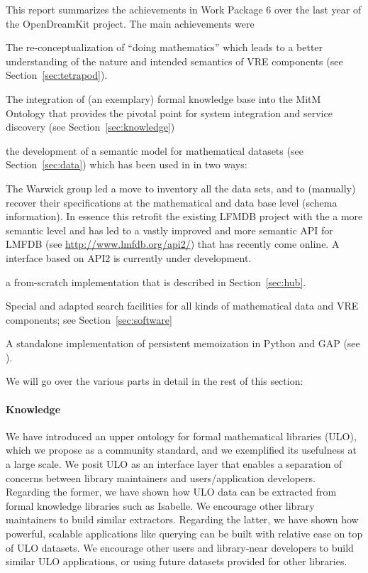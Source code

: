 This report summarizes the achievements in Work Package 6 over the last year of the OpenDreamKit project. The main achievements were
\begin{compactenum}
\item The re-conceptualization of ``doing mathematics'' which leads to a better understanding of the nature and intended semantics of VRE components (see Section~\ref{sec:tetrapod}).
\item The integration of (an exemplary) formal knowledge base into the MitM Ontology that provides the pivotal point for system integration and service discovery (see Section~\ref{sec:knowledge})  
\item the development of a semantic model for mathematical datasets (see Section~\ref{sec:data}) which has been used in  in two ways: 
  \begin{compactitem}
  \item The Warwick group led a move to inventory all the data sets, and to (manually) recover their specifications at the mathematical and data base level (schema information).
    In essence this retrofit the existing LFMDB project with the a more semantic level and has led to a vastly improved and more semantic API for LMFDB (see \url{http://www.lmfdb.org/api2/}) that has recently come online.
    A \Sage interface based on API2 is currently under development.
  \item a from-scratch implementation \dmh  that is described in Section~\ref{sec:hub}.
  \end{compactitem}
\item Special and adapted search facilities for all kinds of mathematical data and VRE components; see Section~\ref{sec:software}
\item A standalone implementation of persistent memoization in Python and GAP (see ).
\end{compactenum}
We will go over the various parts in detail in the rest of this section:

\paragraph{Knowledge}
We have introduced an upper ontology for formal mathematical libraries (ULO), which we propose as a community standard, and we exemplified its usefulness at a large scale.
We posit ULO as an interface layer that enables a separation of concerns between library maintainers and users/application developers.
Regarding the former, we have shown how ULO data can be extracted from formal knowledge libraries such as Isabelle.
We encourage other library maintainers to build similar extractors.
Regarding the latter, we have shown how powerful, scalable applications like querying can be built with relative ease on top of ULO datasets.
We encourage other users and library-near developers to build similar ULO applications, or using future datasets provided for other libraries.

